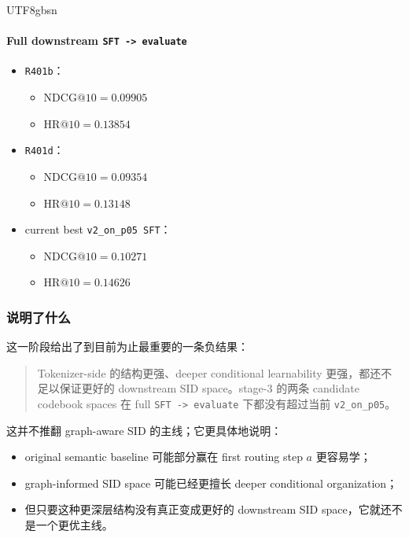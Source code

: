 \documentclass[11pt]{article}
\begin{document}
\begin{CJK*}{UTF8}{gbsn}
\paragraph{Full downstream \texttt{SFT -> evaluate}}

\begin{itemize}
  \item \texttt{R401b}：
  \begin{itemize}
    \item \(\mathrm{NDCG}@10 = 0.09905\)
    \item \(\mathrm{HR}@10 = 0.13854\)
  \end{itemize}
  \item \texttt{R401d}：
  \begin{itemize}
    \item \(\mathrm{NDCG}@10 = 0.09354\)
    \item \(\mathrm{HR}@10 = 0.13148\)
  \end{itemize}
  \item current best \texttt{v2\_on\_p05 SFT}：
  \begin{itemize}
    \item \(\mathrm{NDCG}@10 = 0.10271\)
    \item \(\mathrm{HR}@10 = 0.14626\)
  \end{itemize}
\end{itemize}

\subsubsection*{说明了什么}

这一阶段给出了到目前为止最重要的一条负结果：

\begin{quote}
Tokenizer-side 的结构更强、deeper conditional learnability 更强，都还不足以保证更好的 downstream SID space。stage-3 的两条 candidate codebook spaces 在 full \texttt{SFT -> evaluate} 下都没有超过当前 \texttt{v2\_on\_p05}。
\end{quote}

这并不推翻 graph-aware SID 的主线；它更具体地说明：

\begin{itemize}
  \item original semantic baseline 可能部分赢在 first routing step \(a\) 更容易学；
  \item graph-informed SID space 可能已经更擅长 deeper conditional organization；
  \item 但只要这种更深层结构没有真正变成更好的 downstream SID space，它就还不是一个更优主线。
\end{itemize}


\end{CJK*}
\end{document}

